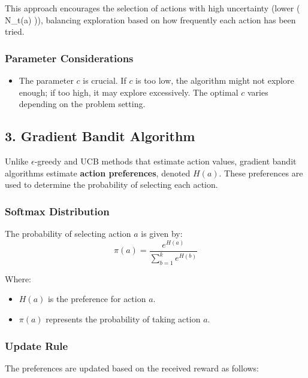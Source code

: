 \documentclass[
  letterpaper,
]{krantz}
\providecommand{\tightlist}{%
  \setlength{\itemsep}{0pt}\setlength{\parskip}{0pt}}\usepackage{longtable,booktabs,array}
\theoremstyle{plain}
\theoremstyle{definition}
\theoremstyle{definition}
\theoremstyle{remark}
\begin{document}
This approach encourages the selection of actions with high uncertainty
(lower ( N\_t(a) )), balancing exploration based on how frequently each
action has been tried.

\subsubsection{Parameter Considerations}\label{parameter-considerations}

\begin{itemize}
\tightlist
\item
  The parameter \(c\) is crucial. If \(c\) is too low, the algorithm
  might not explore enough; if too high, it may explore excessively. The
  optimal \(c\) varies depending on the problem setting.
\end{itemize}

\subsection{3. Gradient Bandit
Algorithm}\label{gradient-bandit-algorithm}

Unlike \(\epsilon\)-greedy and UCB methods that estimate action values,
gradient bandit algorithms estimate \textbf{action preferences}, denoted
\(H(a)\). These preferences are used to determine the probability of
selecting each action.

\subsubsection{Softmax Distribution}\label{softmax-distribution}

The probability of selecting action \(a\) is given by: \[
    \pi(a) =\dfrac{e^{H(a)}}{\displaystyle \sum_{b=1} ^{k} e^{H(b)}}
\]

Where:

\begin{itemize}
\tightlist
\item
  \(H(a)\) is the preference for action \(a\).
\item
  \(\pi(a)\) represents the probability of taking action \(a\).
\end{itemize}

\subsubsection{Update Rule}\label{update-rule-1}

The preferences are updated based on the received reward as follows:
\end{document}
